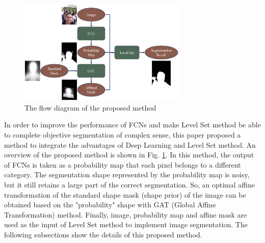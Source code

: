 \begin{figure}[h]
    \centering
    \includegraphics[width = 8cm]{figs/Flow_Diag.eps}
    \caption{The flow diagram of the proposed method}\label{fig: Flow diagram}
\end{figure}

In order to improve the performance of FCNs and make Level Set method be able to complete objective segmentation of complex sense, this paper proposed a method to integrate the advantages of Deep Learning and Level Set method. An overview of the proposed method is shown in Fig. \ref{fig: Flow diagram}. In this method, the output of FCNs is taken as a probability map that each pixel belongs to a different category. The segmentation shape represented by the probability map is noisy, but it still retains a large part of the correct segmentation. So, an optimal affine transformation of the standard shape mask (shape prior) of the image can be obtained based on the "probability" shape with GAT (Global Affine Transformation) method. Finally, image, probability map and affine mask are used as the input of Level Set method to implement image segmentation. The following subsections show the details of this proposed method.

